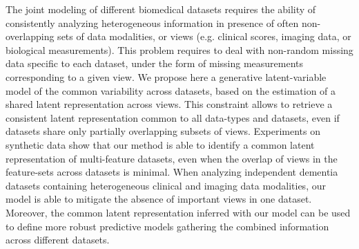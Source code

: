 The joint modeling of different biomedical datasets requires the ability of consistently analyzing heterogeneous information in presence of often non-overlapping sets of data modalities, or views (e.g. clinical scores, imaging data, or biological measurements).
This problem requires to deal with non-random missing data specific to each dataset, under the form of missing measurements corresponding to a given view.
%
We propose here a generative latent-variable model of the common variability across datasets, based on the estimation of a shared latent representation across views.
This constraint allows to retrieve a consistent latent representation common to all data-types and datasets, even if datasets share only partially overlapping subsets of views.
%
Experiments on synthetic data show that our method is able to identify a common latent representation of multi-feature datasets, even when the overlap of views in the feature-sets across datasets is minimal.
%
When analyzing independent dementia datasets containing heterogeneous clinical and imaging data modalities, our model is able to mitigate the absence  of important views in one dataset.
Moreover, the common latent representation inferred with our model can be used to define more robust predictive models gathering the combined information across different datasets.
